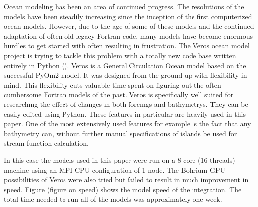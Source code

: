 Ocean modeling has been an area of continued progress. The resolutions of the models have been steadily increasing since the inception of the first computerized ocean models. However, due to the age of some of these models and the continued adaptation of often old legacy Fortran code, many models have become enormous hurdles to get started with often resulting in frustration. The Veros ocean model project is trying to tackle this problem with a totally new code base written entirely in Python (\cite{Hafner2018Aug}). 
Veros is a General Circulation Ocean model based on the successful PyOm2 model. It was designed from the ground up with flexibility in mind. This flexibility cuts valuable time spent on figuring out the often cumbersome Fortran models of the past. Veros is specifically well suited for researching the effect of changes in both forcings and bathymetrys. They can be easily edited using Python. These features in particular are heavily used in this paper. One of the most extensively used features for example is the fact that any bathymetry can, without further manual specifications of islands be used for stream function calculation.

In this case the models used in this paper were run on a 8 core (16 threads) machine using an MPI CPU configuration of 1 node. The Bohrium GPU possibilities of Veros were also tried but failed to result in much improvement in speed. Figure (figure on speed) shows the model speed of the integration. The total time needed to run all of the models was approximately one week.

